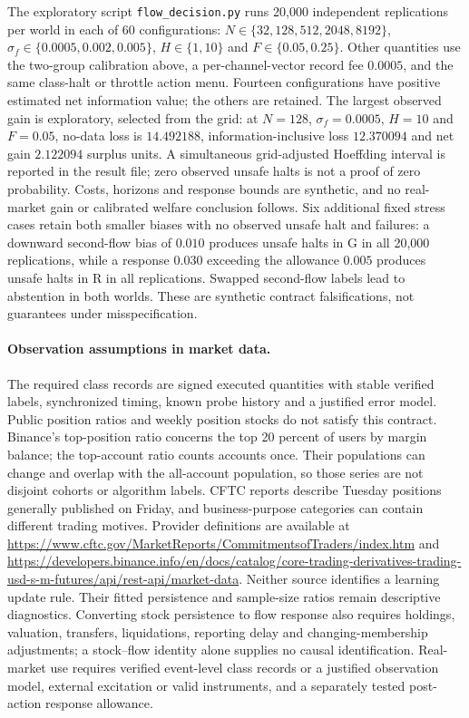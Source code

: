\documentclass[12pt]{article}
\theoremstyle{definition}
\theoremstyle{remark}
\begin{document}
The exploratory script \nolinkurl{flow_decision.py} runs 20,000 independent replications per world in each of 60 configurations: $N\in\{32,128,512,2048,8192\}$, $\sigma_f\in\{0.0005,0.002,0.005\}$, $H\in\{1,10\}$ and $F\in\{0.05,0.25\}$. Other quantities use the two-group calibration above, a per-channel-vector record fee $0.0005$, and the same class-halt or throttle action menu. Fourteen configurations have positive estimated net information value; the others are retained. The largest observed gain is exploratory, selected from the grid: at $N=128$, $\sigma_f=0.0005$, $H=10$ and $F=0.05$, no-data loss is $14.492188$, information-inclusive loss $12.370094$ and net gain $2.122094$ surplus units. A simultaneous grid-adjusted Hoeffding interval is reported in the result file; zero observed unsafe halts is not a proof of zero probability. Costs, horizons and response bounds are synthetic, and no real-market gain or calibrated welfare conclusion follows. Six additional fixed stress cases retain both smaller biases with no observed unsafe halt and failures: a downward second-flow bias of $0.010$ produces unsafe halts in G in all 20,000 replications, while a response $0.030$ exceeding the allowance $0.005$ produces unsafe halts in R in all replications. Swapped second-flow labels lead to abstention in both worlds. These are synthetic contract falsifications, not guarantees under misspecification.

\paragraph{Observation assumptions in market data.}
The required class records are signed executed quantities with stable verified labels, synchronized timing, known probe history and a justified error model. Public position ratios and weekly position stocks do not satisfy this contract. Binance's top-position ratio concerns the top 20 percent of users by margin balance; the top-account ratio counts accounts once. Their populations can change and overlap with the all-account population, so those series are not disjoint cohorts or algorithm labels. CFTC reports describe Tuesday positions generally published on Friday, and business-purpose categories can contain different trading motives. Provider definitions are available at \url{https://www.cftc.gov/MarketReports/CommitmentsofTraders/index.htm} and \url{https://developers.binance.info/en/docs/catalog/core-trading-derivatives-trading-usd-s-m-futures/api/rest-api/market-data}. Neither source identifies a learning update rule. Their fitted persistence and sample-size ratios remain descriptive diagnostics. Converting stock persistence to flow response also requires holdings, valuation, transfers, liquidations, reporting delay and changing-membership adjustments; a stock--flow identity alone supplies no causal identification. Real-market use requires verified event-level class records or a justified observation model, external excitation or valid instruments, and a separately tested post-action response allowance.
\end{document}
